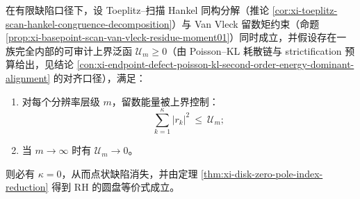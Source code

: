 \begin{conjecture}\label{conj:xi-poisson-kl-vs-vanvleck-residue-energy-closed-loop}
在有限缺陷口径下，设 Toeplitz--扫描 Hankel 同构分解（推论 \ref{cor:xi-toeplitz-scan-hankel-congruence-decomposition}）与 Van Vleck 留数矩约束（命题 \ref{prop:xi-basepoint-scan-van-vleck-residue-moment01}）同时成立，并假设存在一族完全内部的可审计上界泛函 \(\mathcal{U}_m\ge 0\)（由 Poisson--KL 耗散链与 strictification 预算给出，见结论 \ref{con:xi-endpoint-defect-poisson-kl-second-order-energy-dominant-alignment} 的对齐口径），满足：
\begin{enumerate}
  \item 对每个分辨率层级 \(m\)，留数能量被上界控制：
  \[
  \sum_{k=1}^{\kappa}|r_k|^2\ \le\ \mathcal{U}_m;
  \]
  \item 当 \(m\to\infty\) 时有 \(\mathcal{U}_m\to 0\)。
\end{enumerate}
则必有 \(\kappa=0\)，从而点状缺陷消失，并由定理 \ref{thm:xi-disk-zero-pole-index-reduction} 得到 RH 的圆盘等价式成立。
\end{conjecture}

\endinput
